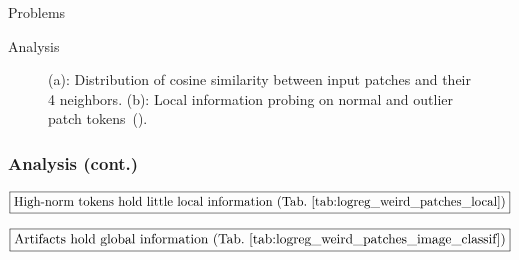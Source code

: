 \documentclass[aspectratio=169]{beamer}
\begin{document}
\begin{section}{Problems}
\begin{subsection}{Analysis}
\begin{frame}
\vspace{1em}
\begin{figure}[t]
    \centering
    \hfill
    \caption{
      (a): Distribution of cosine similarity between input patches and their 4 neighbors.
      (b): Local information probing on normal and outlier patch tokens~(\cite{darcetVisionTransformersNeed2024}).
    }
\end{figure}
\end{frame}

\begin{frame}
\frametitle{Analysis (cont.)}

$$
\boxed{\text{High-norm tokens hold little local information (Tab.~\ref{tab:logreg_weird_patches_local})}}
$$

$$
\boxed{\text{Artifacts hold global information (Tab.~\ref{tab:logreg_weird_patches_image_classif})}}
$$


\end{frame}
\end{subsection}
\end{section}
\end{document}
